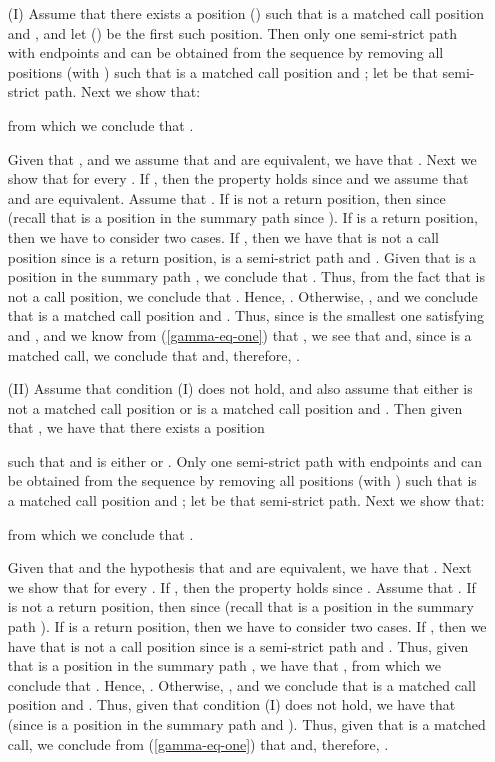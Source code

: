 \documentclass{LMCS}
\theoremstyle{plain}
\theoremstyle{definition}
\begin{document}
\begin{enumerate}[(a)]
\item[(I)] Assume that there exists a position  () such that  is a matched call position and , and let  () be
the first such position. Then only one semi-strict path with
endpoints  and  can be obtained from the sequence
 by removing all positions 
(with ) such that  is a matched call position and
; let 
be that semi-strict path. Next we show that: 

from which we conclude that . 

Given that ,  and we assume that  and  are
equivalent, we have that . Next we show
that  for every . If , then the property holds since  and we assume
that  and  are equivalent. Assume that . If  is not a return position, then  since  (recall
that  is a position in the summary path  since ). If  is a return position, then we have to
consider two cases. If , then we have that  is
not a call position since  is a return position,  is a semi-strict path and . Given that  is a position in the summary path
, we conclude that . Thus, from the fact that  is
not a call position, we conclude that . Hence, . Otherwise, , and we conclude that  is a matched call position and
. Thus, since  is the smallest one
satisfying  and , 
and we know from  (\ref{gamma-eq-one}) that
, we see that 
  and, since   is a
matched call, we conclude that  and,
therefore, .


\item[(II)] Assume that condition (I) does not hold, and also assume
that either  is not a matched call position or  is a matched
call position and . Then given that , we have that there exists a position
 
such that  and  is
either  or . Only one
semi-strict path with endpoints  and  can be
obtained from the sequence  by
removing all positions  (with ) such that 
is a matched call position and ; let  be that semi-strict path. Next we
show that:

from which we conclude that . 

Given that  and the hypothesis that
 and  are equivalent, we have that . Next we show that  for every
. If , then the property holds since .
Assume that . If  is not a return
position, then  since  (recall that  is a position in the summary
path ). If  is a return position, then we have
to consider two cases. If , then we have that 
is not a call position since  is a
semi-strict path and . Thus, given that
 is a position in the summary path , we have that , from which we conclude that
. Hence, . Otherwise, , and we conclude that 
is a matched call position and . Thus, given
that condition (I) does not hold, we have that  (since  is a position in the
summary path  and 
). Thus, given that
 is a matched call, we conclude from (\ref{gamma-eq-one}) that  and, therefore, .  


\end{enumerate}
\end{document}
